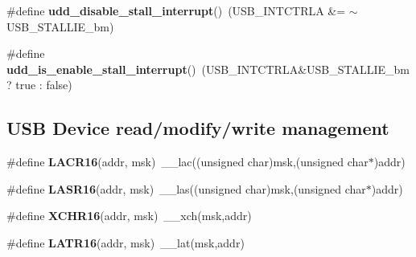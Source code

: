 \begin{DoxyCompactItemize}
\item 
\hypertarget{group__udd__xmega__usb__group_gaf5c4d213b61e0a2e77a22c0c9599892d}{\#define {\bfseries udd\-\_\-disable\-\_\-stall\-\_\-interrupt}()~(U\-S\-B\-\_\-\-I\-N\-T\-C\-T\-R\-L\-A \&= $\sim$U\-S\-B\-\_\-\-S\-T\-A\-L\-L\-I\-E\-\_\-bm)}\label{group__udd__xmega__usb__group_gaf5c4d213b61e0a2e77a22c0c9599892d}

\item 
\hypertarget{group__udd__xmega__usb__group_ga86f7d78290f60ab088b29214f2746863}{\#define {\bfseries udd\-\_\-is\-\_\-enable\-\_\-stall\-\_\-interrupt}()~(U\-S\-B\-\_\-\-I\-N\-T\-C\-T\-R\-L\-A\&U\-S\-B\-\_\-\-S\-T\-A\-L\-L\-I\-E\-\_\-bm ? true \-: false)}\label{group__udd__xmega__usb__group_ga86f7d78290f60ab088b29214f2746863}

\end{DoxyCompactItemize}
\subsection*{U\-S\-B Device read/modify/write management}
\begin{DoxyCompactItemize}
\item 
\hypertarget{group__udd__xmega__usb__group_ga048859b0a809c3bc41a071f35dc115dc}{\#define {\bfseries L\-A\-C\-R16}(addr, msk)~\-\_\-\-\_\-lac((unsigned char)msk,(unsigned char$\ast$)addr)}\label{group__udd__xmega__usb__group_ga048859b0a809c3bc41a071f35dc115dc}

\item 
\hypertarget{group__udd__xmega__usb__group_gaaf6e2396057830a78f515bd834457cde}{\#define {\bfseries L\-A\-S\-R16}(addr, msk)~\-\_\-\-\_\-las((unsigned char)msk,(unsigned char$\ast$)addr)}\label{group__udd__xmega__usb__group_gaaf6e2396057830a78f515bd834457cde}

\item 
\hypertarget{group__udd__xmega__usb__group_gad331aaae1172fca7ec2b49bfd9b3a5ff}{\#define {\bfseries X\-C\-H\-R16}(addr, msk)~\-\_\-\-\_\-xch(msk,addr)}\label{group__udd__xmega__usb__group_gad331aaae1172fca7ec2b49bfd9b3a5ff}

\item 
\hypertarget{group__udd__xmega__usb__group_gaff08c233c2171f67eb38375006ac07ac}{\#define {\bfseries L\-A\-T\-R16}(addr, msk)~\-\_\-\-\_\-lat(msk,addr)}\label{group__udd__xmega__usb__group_gaff08c233c2171f67eb38375006ac07ac}

\end{DoxyCompactItemize}
